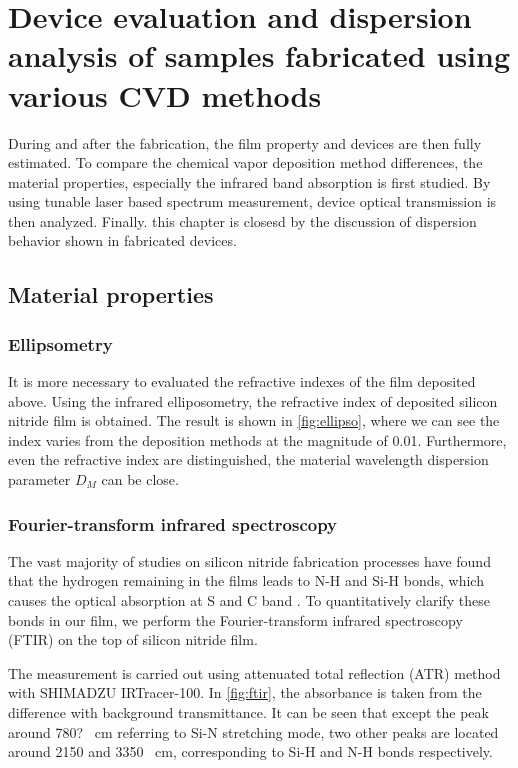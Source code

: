 
\chapter{Device evaluation and dispersion analysis of samples fabricated using various CVD methods}%
During and after the fabrication, the film property and devices are then fully estimated. To compare the chemical vapor deposition method differences, the material properties, especially the infrared band absorption is first studied. By using tunable laser based spectrum measurement, device optical transmission is then analyzed. Finally. this chapter is closesd by the discussion of dispersion behavior shown in fabricated devices.

\section{Material properties}

\subsection{Ellipsometry}

It is more necessary to evaluated the refractive indexes of the film deposited above. Using the infrared elliposometry, the refractive index of deposited silicon nitride film is obtained. The result is shown in \autoref{fig:ellipso}, where we can see the index varies from the deposition methods at the magnitude of 0.01.
Furthermore, even the refractive index are distinguished, the material wavelength dispersion parameter $D_M$ can be close.

\subsection{Fourier-transform infrared spectroscopy}

The vast majority of studies on silicon nitride fabrication processes have found that the hydrogen remaining in the films leads to N-H and Si-H bonds, which causes the optical absorption at S and C band \cites{Ay2004, Agnihotri2000}. To quantitatively clarify these bonds in our film, we perform the Fourier-transform infrared spectroscopy (FTIR) on the top of silicon nitride film.

The measurement is carried out using attenuated total reflection (ATR) method with SHIMADZU IRTracer-100. In \autoref{fig:ftir}, the absorbance is taken from the difference with background transmittance. It can be seen that except the peak around 780? \si{\per\cm} referring to Si-N stretching mode, two other peaks are located around 2150 and 3350 \si{\per\cm}, corresponding to Si-H and N-H bonds respectively.

